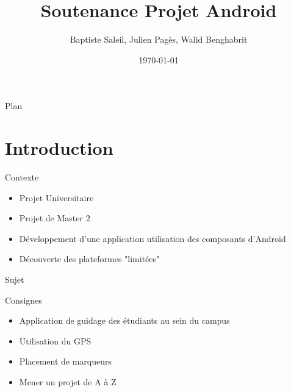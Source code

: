 \documentclass{beamer}
\title{Soutenance Projet Android}
\author{Baptiste Saleil, Julien Pagès, Walid Benghabrit}
\date{\today}
\begin{document}
	\begin{frame}
		\titlepage
	\end{frame}

	\begin{frame}{Plan}
		\tableofcontents
	\end{frame}

	\section{Introduction}
		\begin{frame}{Contexte}
			\begin{itemize}
				\item Projet Universitaire
				\item Projet de Master 2
				\item Développement d'une application utilisation des composants d'Android
				\item Découverte des plateformes "limitées"
			\end{itemize}
		\end{frame}
		
		\begin{frame}{Sujet}
			\begin{exampleblock}{Consignes}
				\begin{itemize}
					\item Application de guidage des étudiants au sein du campus 
					\item Utilisation du GPS
					\item Placement de marqueurs
					\item Mener un projet de A à Z
				\end{itemize}
			\end{exampleblock}
		\end{frame}
		
\end{document}
